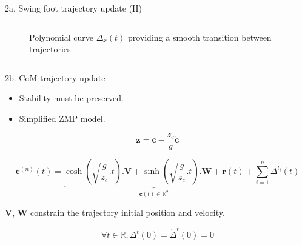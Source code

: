\documentclass[hyperref={pdfpagelabels=false}]{beamer}
\begin{document}
\begin{frame}{2a. Swing foot trajectory update (II)}
\begin{columns}[c]
\begin{column}{0.5\textwidth}
\begin{figure}[ht!]
\begin{center}
  \end{center}
  \caption{Polynomial curve $\Delta_{x}(t)$ providing a smooth
    transition between trajectories. \label{fig:transition}}
\end{figure}

    \end{column}
   \end{columns}

\end{frame}

\begin{frame}{2b. CoM trajectory update}

  \begin{itemize}
  \item Stability must be preserved.
  \item Simplified ZMP model.\\
    \footnotesize
    \cite{11icra.perrin}
  \end{itemize}

  \begin{equation}
    \mathbf{z} = \mathbf{c} - \frac{z_c}{g} \ddot{\mathbf{c}}
  \end{equation}

  \begin{equation} \label{eq:zmpsolcor}
    \mathbf{c}^{(n)}(t) =
    \underbrace{\scriptstyle \cosh(\sqrt{\frac{g}{z_c}}.t) . \mathbf{V} +
      \sinh(\sqrt{\frac{g}{z_c}}.t) . \mathbf{W} +
      \mathbf{r}(t)}_{\mathbf{c}(t) \in \mathbb{R}^2} + \sum_{i=1}^n \Delta^{t_i}(t)
  \end{equation}

  \begin{center}
    $\mathbf{V}$, $\mathbf{W}$ constrain the trajectory initial
    position and velocity.
  \end{center}

  \begin{equation}
    \forall t \in \mathbb{R}, \Delta^t(0) = \dot{\Delta}^t(0) = 0
  \end{equation}
\end{frame}
\end{document}
